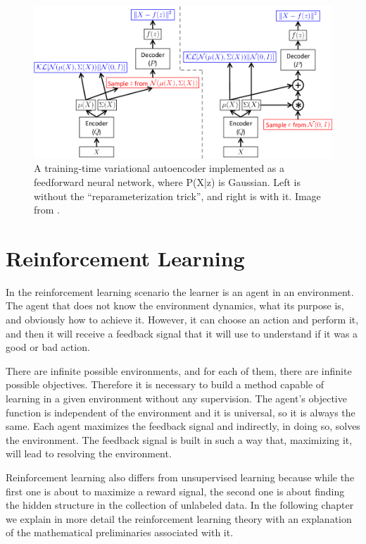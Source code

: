 \begin{figure}[h]
\centering
     \includegraphics[width=1.0\textwidth]{pictures/vae_struct}
      \caption{A training-time variational autoencoder implemented as a feedforward neural network, where P(X|z) is Gaussian. Left is without the “reparameterization trick”, and right is with it. Image from \cite{doersch2016tutorial}.}
\end{figure}


\section{Reinforcement Learning}
In the reinforcement learning scenario the learner is an agent in an environment. The agent that does not know the environment dynamics, what its purpose is, and obviously how to achieve it.
However, it can choose an action and perform it, and then it will receive a feedback signal that it will use to understand if it was a good or bad action. 

There are infinite possible environments, and for each of them, there are infinite possible objectives. 
Therefore it is necessary to build a method capable of learning in a given environment without any supervision.
The agent's objective function is independent of the environment and it is universal, so it is always the same.
Each agent maximizes the feedback signal and indirectly, in doing so, solves the environment.
The feedback signal is built in such a way that, maximizing it, will lead to resolving the environment. 

Reinforcement learning also differs from unsupervised learning because while the first one is about to maximize a reward signal, the second one is about finding the hidden structure in the collection of unlabeled data.
In the following chapter we explain in more detail the reinforcement learning theory with an explanation of the mathematical preliminaries associated with it.




